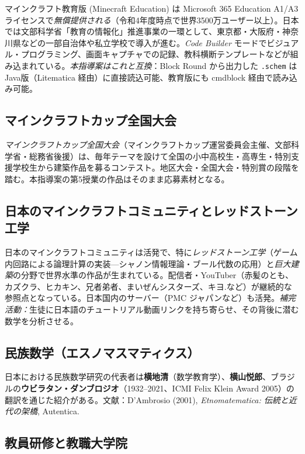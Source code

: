 \documentclass[12pt,a4paper]{scrartcl}
\newcommand{\acc}[1]{\textcolor{accent}{\textbf{#1}}}
\begin{document}
マインクラフト教育版 (Minecraft Education) は Microsoft 365 Education A1/A3 ライセンスで\emph{無償提供される}（令和4年度時点で世界3500万ユーザー以上）。日本では文部科学省「教育の情報化」推進事業の一環として、東京都・大阪府・神奈川県などの一部自治体や私立学校で導入が進む。\emph{Code Builder} モードでビジュアル・プログラミング、画面キャプチャでの記録、教科横断テンプレートなどが組み込まれている。\emph{本指導案はこれと互換}：Block Round から出力した \texttt{.schem} は Java版（Litematica 経由）に直接読込可能、教育版にも cmdblock 経由で読み込み可能。

\subsection{マインクラフトカップ全国大会}

\emph{マインクラフトカップ全国大会}（マインクラフトカップ運営委員会主催、文部科学省・総務省後援）は、毎年テーマを設けて全国の小中高校生・高専生・特別支援学校生から建築作品を募るコンテスト。地区大会・全国大会・特別賞の段階を踏む。本指導案の第5授業の作品はそのまま応募素材となる。

\subsection{日本のマインクラフトコミュニティとレッドストーン工学}

日本のマインクラフトコミュニティは活発で、特に\emph{レッドストーン工学}（ゲーム内回路による論理計算の実装---シャノン情報理論・ブール代数の応用）と\emph{巨大建築}の分野で世界水準の作品が生まれている。配信者・YouTuber（赤髪のとも、カズクラ、ヒカキン、兄者弟者、まいぜんシスターズ、キヨ.など）が継続的な参照点となっている。日本国内のサーバー（PMC ジャパンなど）も活発。\emph{補完活動：}生徒に日本語のチュートリアル動画リンクを持ち寄らせ、その背後に潜む数学を分析させる。

\subsection{民族数学（エスノマスマティクス）}

日本における民族数学研究の代表者は\acc{横地清}（数学教育学）、\acc{横山悦郎}、ブラジルの\acc{ウビラタン・ダンブロジオ}（1932--2021、ICMI Felix Klein Award 2005）の翻訳を通じた紹介がある。文献：D'Ambrosio (2001), \emph{Etnomatematica: 伝統と近代の架橋}, Autentica.

\subsection{教員研修と教職大学院}
\end{document}
